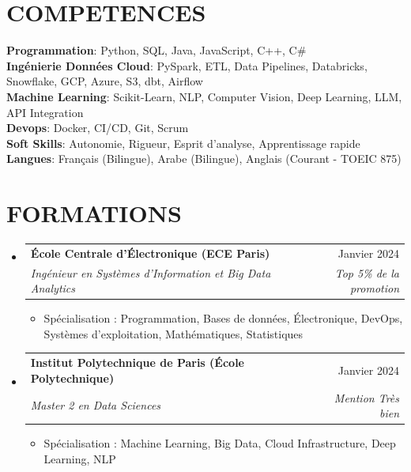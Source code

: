 \documentclass[11pt,a4paper]{article}
\makeatletter
\newcommand{\resumeItem}[1]{
  \item\footnotesize{
    {#1 \vspace{-1pt}}
  }
}
\newcommand{\resumeSubheading}[4]{
  \vspace{2pt}\item
    \begin{tabular*}{\textwidth}[t]{l@{\extracolsep{\fill}}r}
      {\footnotesize\textbf{#1}} & {\footnotesize#2} \\
      {\footnotesize\textit{#3}} & {\footnotesize\textit{#4}} \\
    \end{tabular*}\vspace{2pt}
}
\newcommand{\resumeSubHeadingListStart}{\begin{itemize}[leftmargin=0in, label={}]}
\newcommand{\resumeSubHeadingListEnd}{\end{itemize}}
\newcommand{\resumeItemListStart}{\begin{itemize}[label={\textbullet}]}
\newcommand{\resumeItemListEnd}{\end{itemize}\vspace{0pt}}
\makeatother
\begin{document}
\section{COMPETENCES}
\begin{itemize}[leftmargin=0in, label={}]
\footnotesize{\item{
{\footnotesize\textbf{Programmation}:} {\footnotesize Python, SQL, Java, JavaScript, C++, C{\#}} \\
\vspace{3pt}
{\footnotesize\textbf{Ingénierie Données Cloud}:} {\footnotesize PySpark, ETL, Data Pipelines, Databricks, Snowflake, GCP, Azure, S3, dbt, Airflow} \\
\vspace{3pt}
{\footnotesize\textbf{Machine Learning}:} {\footnotesize Scikit-Learn, NLP, Computer Vision, Deep Learning, LLM, API Integration} \\
\vspace{3pt}
{\footnotesize\textbf{Devops}:} {\footnotesize Docker, CI/CD, Git, Scrum} \\
\vspace{3pt}
{\footnotesize\textbf{Soft Skills}:} {\footnotesize Autonomie, Rigueur, Esprit d'analyse, Apprentissage rapide} \\
\vspace{3pt}
{\footnotesize\textbf{Langues}:} {\footnotesize Français (Bilingue), Arabe (Bilingue), Anglais (Courant - TOEIC 875)}
}
}
\end{itemize}

\section{FORMATIONS}
\resumeSubHeadingListStart
    \resumeSubheading
      {École Centrale d'Électronique (ECE Paris)}
      {Janvier 2024}
      {Ingénieur en Systèmes d'Information et Big Data Analytics}
      {Top 5\% de la promotion}
      \resumeItemListStart
        \resumeItem{Spécialisation : Programmation, Bases de données, Électronique, DevOps, Systèmes d'exploitation, Mathématiques, Statistiques}
      \resumeItemListEnd
    \resumeSubheading
      {Institut Polytechnique de Paris (École Polytechnique)}
      {Janvier 2024}
      {Master 2 en Data Sciences}
      {Mention Très bien}
      \resumeItemListStart
        \resumeItem{Spécialisation : Machine Learning, Big Data, Cloud Infrastructure, Deep Learning, NLP}
      \resumeItemListEnd
  \resumeSubHeadingListEnd
\end{document}
